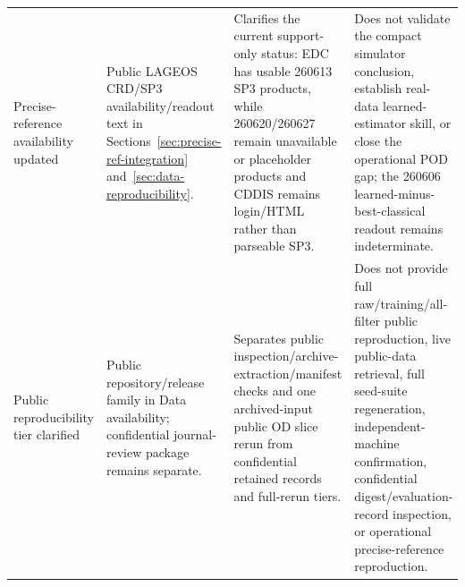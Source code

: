 \begin{table}[t]
{\begin{tabular}{p{3.1cm} p{4.6cm} p{4.0cm} p{5.3cm}}
\addlinespace
Precise-reference availability updated & Public LAGEOS CRD/SP3 availability/readout text in Sections~\ref{sec:precise-ref-integration} and~\ref{sec:data-reproducibility}. & Clarifies the current support-only status: EDC has usable 260613 SP3 products, while 260620/260627 remain unavailable or placeholder products and CDDIS remains login/HTML rather than parseable SP3. & Does not validate the compact simulator conclusion, establish real-data learned-estimator skill, or close the operational POD gap; the 260606 learned-minus-best-classical readout remains indeterminate. \\
\addlinespace
Public reproducibility tier clarified & Public repository/release family in Data availability; confidential journal-review package remains separate. & Separates public inspection/archive-extraction/manifest checks and one archived-input public OD slice rerun from confidential retained records and full-rerun tiers. & Does not provide full raw/training/all-filter public reproduction, live public-data retrieval, full seed-suite regeneration, independent-machine confirmation, confidential digest/evaluation-record inspection, or operational precise-reference reproduction. \\
\bottomrule
\end{tabular}%
}
\end{table}
